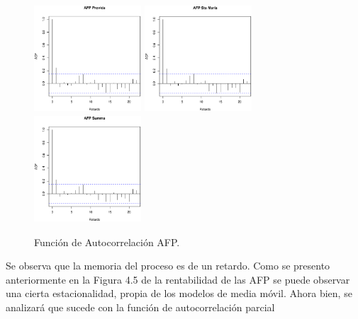 \begin{figure}[!ht]
\centering
  \includegraphics[height=4cm, width=4cm]{acf5.eps}
  \includegraphics[height=4cm, width=4cm]{acf6.eps}
  \includegraphics[height=4cm, width=4cm]{acf7.eps}
   \caption{Funci\'on de Autocorrelaci\'on AFP.}
\label{caja}
\end{figure}

Se observa que la memoria del proceso  es de un retardo. Como se presento anteriormente en la Figura 4.5 de la rentabilidad de las AFP se puede observar una cierta estacionalidad, propia de los modelos de media m\'ovil. Ahora bien, se analizar\'a que sucede con la funci\'on de autocorrelaci\'on parcial

